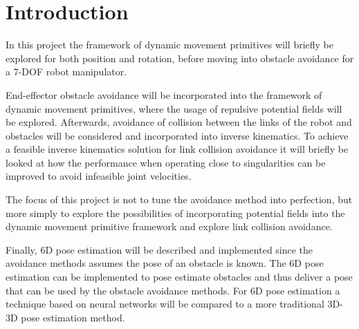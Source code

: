 \documentclass[../main.tex]{subfiles}
\begin{document}
\section{Introduction}
\label{sec:intro}
In this project the framework of dynamic movement primitives will briefly be explored for both position and rotation, before moving into obstacle avoidance for a 7-DOF robot manipulator. 

End-effector obstacle avoidance will be incorporated into the framework of dynamic movement primitives, where the usage of repulsive potential fields will be explored. Afterwards, avoidance of collision between the links of the robot and obstacles will be considered and incorporated into inverse kinematics. To achieve a feasible inverse kinematics solution for link collision avoidance it will briefly be looked at how the performance when operating close to singularities can be improved to avoid infeasible joint velocities.

The focus of this project is not to tune the avoidance method into perfection, but more simply to explore the possibilities of incorporating potential fields into the dynamic movement primitive framework and explore link collision avoidance.

Finally, 6D pose estimation will be described and implemented since the avoidance methods assumes the pose of an obstacle is known. The 6D pose estimation can be implemented to pose estimate obstacles and thus deliver a pose that can be used by the obstacle avoidance methods. For 6D pose estimation a technique based on neural networks will be compared to a more traditional 3D-3D pose estimation method.
\end{document}
